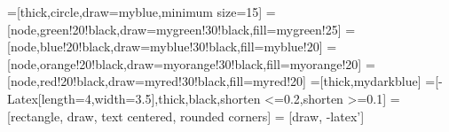 %

\tikzset{>=latex} %
\usepackage{xcolor}
=[thick,circle,draw=myblue,minimum size=15]
=[node,green!20!black,draw=mygreen!30!black,fill=mygreen!25]
=[node,blue!20!black,draw=myblue!30!black,fill=myblue!20]
=[node,orange!20!black,draw=myorange!30!black,fill=myorange!20]
=[node,red!20!black,draw=myred!30!black,fill=myred!20]
=[thick,mydarkblue] %
=[-{Latex[length=4,width=3.5]},thick,black,shorten <=0.2,shorten >=0.1]
 = [rectangle, draw, text centered, rounded corners]
 = [draw, -latex']


